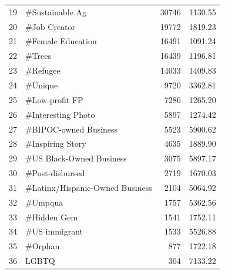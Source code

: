 \begin{longtable}{|c|l|r|r|}
	19          & \#Sustainable Ag                 & 30746                  & 1130.55                      \\
	20          & \#Job Creator                    & 19772                  & 1819.23                      \\
	21          & \#Female Education               & 16491                  & 1091.24                      \\
	22          & \#Trees                          & 16439                  & 1196.81                      \\
	23          & \#Refugee                        & 14033                  & 1409.83                      \\
	24          & \#Unique                         & 9720                   & 3362.81                      \\
	25          & \#Low-profit FP                  & 7286                   & 1265.20                      \\
	26          & \#Interesting Photo              & 5897                   & 1274.42                      \\
	27          & \#BIPOC-owned Business           & 5523                   & 5900.62                      \\
	28          & \#Inspiring Story                & 4635                   & 1889.90                      \\
	29          & \#US Black-Owned Business        & 3075                   & 5897.17                      \\
	30          & \#Post-disbursed                 & 2719                   & 1670.03                      \\
	31          & \#Latinx/Hispanic-Owned Business & 2104                   & 5064.92                      \\
	32          & \#Umpqua                         & 1757                   & 5362.56                      \\
	33          & \#Hidden Gem                     & 1541                   & 1752.11                      \\
	34          & \#US immigrant                   & 1533                   & 5526.88                      \\
	35          & \#Orphan                         & 877                    & 1722.18                      \\
	36          & LGBTQ                            & 304                    & 7133.22                      \\

\end{longtable}
